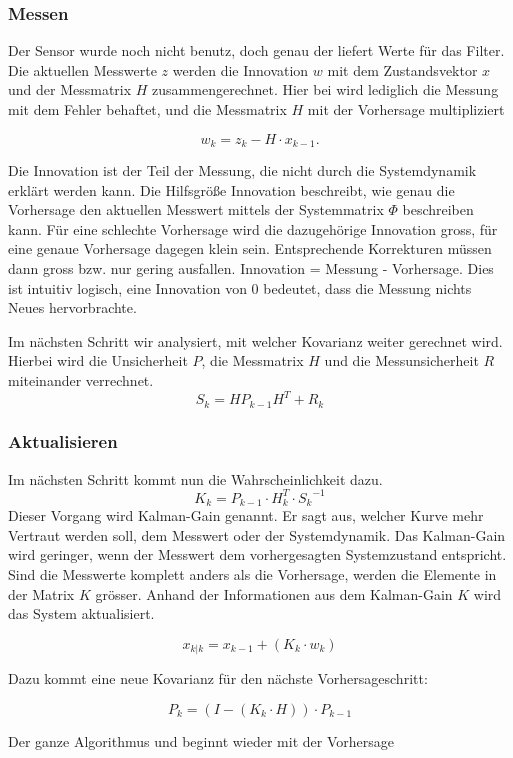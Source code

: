 \subsubsection*{Messen}
Der Sensor wurde noch nicht benutz, doch genau der liefert Werte für das Filter. 
Die aktuellen Messwerte $z$ werden die Innovation $w$ mit dem Zustandsvektor $x$ und der Messmatrix $H$ zusammengerechnet.
Hier bei wird lediglich die Messung mit dem Fehler behaftet, und die Messmatrix $H$ mit der Vorhersage multipliziert

\[{w_{k}}={z_{k}}-{H}\cdot{x_{k-1}}.\] 

Die Innovation ist der Teil der Messung, die nicht durch die Systemdynamik erklärt werden kann. 
Die Hilfsgröße Innovation beschreibt, wie genau die Vorhersage den aktuellen Messwert mittels der Systemmatrix $\Phi$ beschreiben kann. 
Für eine schlechte Vorhersage wird die dazugehörige Innovation gross, für eine genaue Vorhersage dagegen klein sein. 
Entsprechende Korrekturen müssen dann gross bzw. nur gering ausfallen. 
Innovation = Messung - Vorhersage. Dies ist intuitiv logisch, eine Innovation von 0 bedeutet, dass die Messung nichts Neues hervorbrachte.

Im nächsten Schritt wir analysiert, mit welcher Kovarianz weiter gerechnet wird. 
Hierbei wird die Unsicherheit $P$, die Messmatrix $H$ und die Messunsicherheit $R$ miteinander verrechnet. 
\[ 
{S_{k}}={H}{P_{k-1}}{H}^T+{R_{k}}
 \] 

\subsubsection*{Aktualisieren}
Im nächsten Schritt kommt nun die Wahrscheinlichkeit dazu. 
\[ 
{K_{k}}= {{P_{k-1}} \cdot {H_{k}^T}}\cdot {S_{k}}^{-1} 
 \] 
Dieser Vorgang wird Kalman-Gain genannt. 
Er sagt aus, welcher Kurve mehr Vertraut werden soll, dem Messwert oder der Systemdynamik.
Das Kalman-Gain wird geringer, wenn der Messwert dem vorhergesagten Systemzustand entspricht. 
Sind die Messwerte komplett anders als die Vorhersage, werden die Elemente in der Matrix $K$ grösser.
Anhand der Informationen aus dem Kalman-Gain $K$ wird das System aktualisiert.

\[ 
{x_{k|k}}={x_{k-1}}+({K_{k}}\cdot {w_{k}}) 
 \] 

Dazu kommt  eine neue Kovarianz für den nächste Vorhersageschritt:

\[ 
{P_{k}}=(I-({K_{k}} \cdot {H})) \cdot {P_{k-1}}  
 \] 

Der ganze Algorithmus und beginnt wieder mit der Vorhersage 

